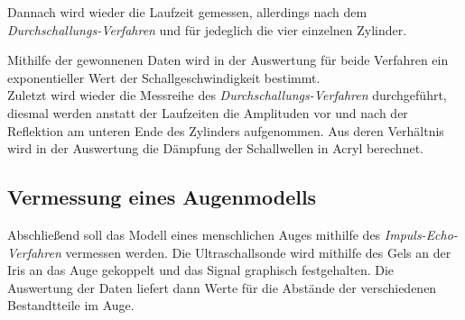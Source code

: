 Dannach wird wieder die Laufzeit gemessen, allerdings nach dem \textit{Durchschallungs-Verfahren} und für jedeglich die
vier einzelnen Zylinder.

Mithilfe der gewonnenen Daten wird in der Auswertung für beide Verfahren ein exponentieller Wert der Schallgeschwindigkeit bestimmt. \\

Zuletzt wird wieder die Messreihe des \textit{Durchschallungs-Verfahren} durchgeführt, diesmal werden anstatt der Laufzeiten die
Amplituden vor und nach der Reflektion am unteren Ende des Zylinders aufgenommen.
Aus deren Verhältnis wird in der Auswertung die Dämpfung der Schallwellen in Acryl berechnet.

\subsection{Vermessung eines Augenmodells}

Abschließend soll das Modell eines menschlichen Auges mithilfe des \textit{Impuls-Echo-Verfahren} vermessen werden.
Die Ultraschallsonde wird mithilfe des Gels an der Iris an das Auge gekoppelt und das Signal graphisch festgehalten.
Die Auswertung der Daten liefert dann Werte für die Abstände der verschiedenen Bestandtteile im Auge.